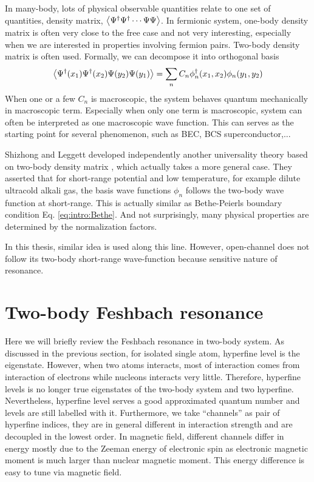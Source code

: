  In many-body, lots of physical observable quantities relate to one set of  quantities, density matrix, $\bigl<{\Psi^{\dagger}\Psi^{\dagger}\cdots\Psi\Psi}\bigr>$. In fermionic system,  one-body density matrix is often very close to the free case and not very interesting, especially when we are interested in properties involving fermion pairs.  Two-body density matrix is often used. Formally, we can decompose it into orthogonal basis
 \begin{equation}
 \bigl<{\Psi^{\dagger}(x_1)\Psi^{\dagger}(x_2)\Psi(y_2)\Psi(y_1)}\bigr>=\sum_nC_n\phi_n^{\dagger}(x_1,x_2)\phi_n(y_1,y_2)
 \end{equation}     
 When one or a few $C_n$ is macroscopic, the system behaves quantum mechanically in macroscopic term.  Especially when only one term is macroscopic, system can often be interpreted as one macroscopic wave function.\cite{Leggett}  This can serves as the starting point for several phenomenon, such as BEC, BCS superconductor,...
 
Shizhong and Leggett developed independently another universality theory based on two-body density matrix \linebreak[2] \cite{shizhongUniv}, which actually takes a more general case.   They asserted that for short-range potential and low temperature, for example dilute ultracold alkali gas, the basis wave functions $\phi_n$ follows the two-body wave function at short-range. This is actually similar as Bethe-Peierls boundary condition Eq. \ref{eq:intro:Bethe}.  And not surprisingly, many physical properties are determined by the normalization factors.  

In this thesis, similar idea is used along this line.  However, open-channel does not follow its two-body short-range wave-function because sensitive nature of resonance. 
 
 
 \section{Two-body Feshbach resonance\label{sec:intro:twobody}}
Here we will briefly review the Feshbach resonance in two-body system.   As discussed in the previous section, for isolated single atom, hyperfine level is the eigenstate.  However, when two atoms interacts, most of interaction comes from interaction of electrons while nucleons interacts very little.  Therefore, hyperfine levels is no longer true eigenstates of the two-body system and two hyperfine.  Nevertheless, hyperfine level serves a good approximated quantum number and levels are still labelled with it. Furthermore, we take ``channels'' as pair of hyperfine indices, they are in general different in interaction strength and are decoupled in the lowest order.  In magnetic field, different channels differ in energy mostly due to the Zeeman energy of electronic spin as electronic magnetic moment is much larger than nuclear magnetic moment.  This energy difference is easy to tune via magnetic field.  

